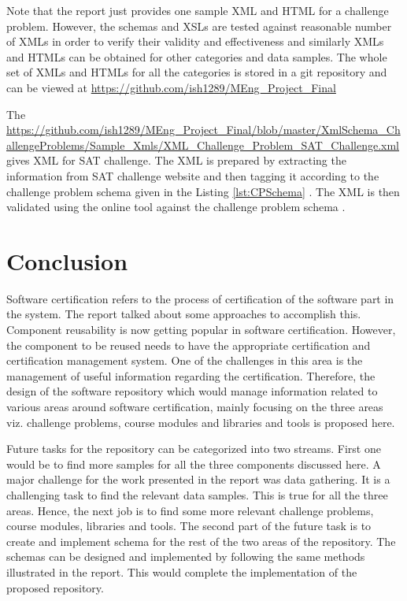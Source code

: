 \documentclass[11pt,letterpaper]{report}
\begin{document}
Note that the report just provides one sample XML and HTML for a challenge problem. However, the schemas and XSLs are tested against reasonable number of XMLs in order to verify their validity and effectiveness and similarly XMLs and HTMLs can be obtained for other categories and data samples. The whole set of XMLs and HTMLs for all the categories is stored in a git repository and can be viewed at \url{https://github.com/ish1289/MEng_Project_Final}

The \url{https://github.com/ish1289/MEng_Project_Final/blob/master/XmlSchema_ChallengeProblems/Sample_Xmls/XML_Challenge_Problem_SAT_Challenge.xml} gives XML for SAT challenge. The XML is prepared by extracting the information from SAT challenge website and then tagging it according to the challenge problem schema given in the Listing \ref{lst:CPSchema} \cite{SAT}. The XML is then validated using the online tool against the challenge problem schema \cite{olXSD}.

\chapter{Conclusion}
Software certification refers to the process of certification of the software part in the system. The report talked about some approaches to accomplish this. Component reusability is now getting popular in software certification. However, the component to be reused needs to have the appropriate certification and certification management system. One of the challenges in this area is the management of useful information regarding the certification. Therefore, the design of the software repository which would manage information related to various areas around software certification, mainly focusing on the three areas viz. challenge problems, course modules and libraries and tools is proposed here.  

Future tasks for the repository can be categorized into two streams. First one would be to find more samples for all the three components discussed here. A major challenge for the work presented in the report was data gathering. It is a challenging task to find the relevant data samples. This is true for all the three areas. Hence, the next job is to find some more relevant challenge problems, course modules, libraries and tools. The second part of the future task is to create and implement schema for the rest of the two areas of the repository. The schemas can be designed and implemented by following the same methods illustrated in the report. This would complete the implementation of the proposed repository.  
\end{document}
